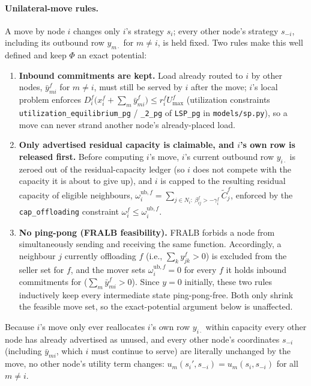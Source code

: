 \paragraph{Unilateral-move rules.} A move by node $i$ changes only $i$'s
strategy $s_i$; every other node's strategy $s_{-i}$, including its outbound
row $y_{m\cdot}$ for $m\ne i$, is held fixed. Two rules make this well
defined and keep $\Phi$ an exact potential:
\begin{enumerate}
\item \textbf{Inbound commitments are kept.} Load already routed to $i$ by
  other nodes, $\bar y_{mi}^f$ for $m\ne i$, must still be served by $i$ after
  the move; $i$'s local problem enforces $D_i^f\big(x_i^f+\sum_m \bar y_{mi}^f\big)\le r_i^f U_{\max}^f$
  (utilization constraints \texttt{utilization\_equilibrium\_pg} /
  \texttt{\_2\_pg} of \texttt{LSP\_pg} in \texttt{models/sp.py}), so a move
  can never strand another node's already-placed load.
\item \textbf{Only advertised residual capacity is claimable, and $i$'s own
  row is released first.} Before computing $i$'s move, $i$'s current outbound
  row $y_{i\cdot}$ is zeroed out of the residual-capacity ledger (so $i$ does
  not compete with the capacity it is about to give up), and $i$ is capped to
  the resulting residual capacity of eligible neighbours,
  $\omega_i^{\mathrm{ub},f}=\sum_{j\in N_i:\ \beta_{ij}^f>-\gamma_i^f}\tilde C_j^f$,
  enforced by the \texttt{cap\_offloading} constraint $\omega_i^f\le\omega_i^{\mathrm{ub},f}$.
\item \textbf{No ping-pong (FRALB feasibility).} FRALB forbids a node from
  simultaneously sending and receiving the same function. Accordingly, a
  neighbour $j$ currently offloading $f$ (i.e., $\sum_k y_{jk}^f>0$) is
  excluded from the seller set for $f$, and the mover sets
  $\omega_i^{\mathrm{ub},f}=0$ for every $f$ it holds inbound commitments
  for ($\sum_m \bar y_{mi}^f>0$). Since $y=0$ initially, these two rules
  inductively keep every intermediate state ping-pong-free. Both only
  shrink the feasible move set, so the exact-potential argument below is
  unaffected.
\end{enumerate}
Because $i$'s move only ever reallocates $i$'s own row $y_{i\cdot}$ within
capacity every other node has already advertised as unused, and every other
node's coordinates $s_{-i}$ (including $\bar y_{mi}$, which $i$ must
continue to serve) are literally unchanged by the move, no other node's
utility term changes: $u_m(s_i',s_{-i})=u_m(s_i,s_{-i})$ for all $m\ne i$.

